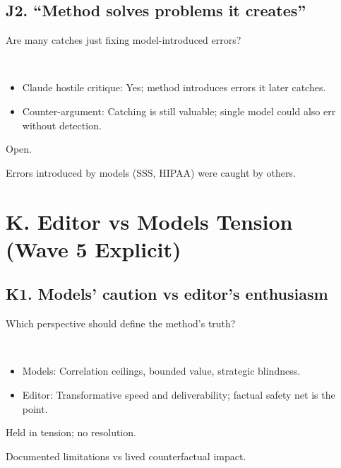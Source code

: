 \documentclass[11pt,letterpaper]{article}
\begin{document}
\subsection{J2. ``Method solves problems it creates''}

\begin{reflist}
\item[Dispute:] Are many catches just fixing model-introduced errors?
\item[Positions:]~
  \begin{itemize}[nosep]
    \item Claude hostile critique: Yes; method introduces errors it later catches.
    \item Counter-argument: Catching is still valuable; single model could also err without detection.
  \end{itemize}
\item[Status:] Open.
\item[Evidence:] Errors introduced by models (SSS, HIPAA) were caught by others.
\end{reflist}

\section{K. Editor vs Models Tension (Wave 5 Explicit)}

\subsection{K1. Models' caution vs editor's enthusiasm}

\begin{reflist}
\item[Dispute:] Which perspective should define the method's truth?
\item[Positions:]~
  \begin{itemize}[nosep]
    \item Models: Correlation ceilings, bounded value, strategic blindness.
    \item Editor: Transformative speed and deliverability; factual safety net is the point.
  \end{itemize}
\item[Status:] Held in tension; no resolution.
\item[Evidence:] Documented limitations vs lived counterfactual impact.
\end{reflist}
\end{document}
